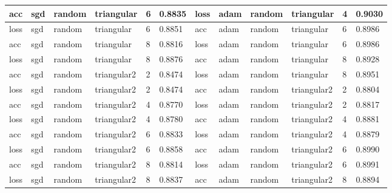 \begin{table}[H]
\begin{adjustbox}{width=1\textwidth}
\begin{tabular}{|l|l|l|l|l|l||l|l|l|l|l|l|}
acc           & sgd          & random        & triangular       & 6             & 0.8835            & loss          & adam         & random        & triangular       & 4             & 0.9030            \\ \hline
loss          & sgd          & random        & triangular       & 6             & 0.8851            & acc           & adam         & random        & triangular       & 6             & 0.8986            \\ \hline
acc           & sgd          & random        & triangular       & 8             & 0.8816            & loss          & adam         & random        & triangular       & 6             & 0.8986            \\ \hline
loss          & sgd          & random        & triangular       & 8             & 0.8876            & acc           & adam         & random        & triangular       & 8             & 0.8928            \\ \hline
acc           & sgd          & random        & triangular2      & 2             & 0.8474            & loss          & adam         & random        & triangular       & 8             & 0.8951            \\ \hline
loss          & sgd          & random        & triangular2      & 2             & 0.8474            & acc           & adam         & random        & triangular2      & 2             & 0.8804            \\ \hline
acc           & sgd          & random        & triangular2      & 4             & 0.8770            & loss          & adam         & random        & triangular2      & 2             & 0.8817            \\ \hline
loss          & sgd          & random        & triangular2      & 4             & 0.8780            & acc           & adam         & random        & triangular2      & 4             & 0.8881            \\ \hline
acc           & sgd          & random        & triangular2      & 6             & 0.8833            & loss          & adam         & random        & triangular2      & 4             & 0.8879            \\ \hline
loss          & sgd          & random        & triangular2      & 6             & 0.8858            & acc           & adam         & random        & triangular2      & 6             & 0.8990            \\ \hline
acc           & sgd          & random        & triangular2      & 8             & 0.8814            & loss          & adam         & random        & triangular2      & 6             & 0.8991            \\ \hline
loss          & sgd          & random        & triangular2      & 8             & 0.8837            & acc           & adam         & random        & triangular2      & 8             & 0.8894            \\ \hline
\end{tabular}
\end{adjustbox}
\label{t_res_densenet}
\end{table}

